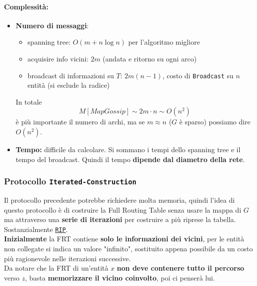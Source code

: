 \paragraph{Complessità:}
\begin{itemize}
	\item \textbf{Numero di messaggi}:
	\begin{itemize}
		\item spanning tree: $O(m + n \log n)$ per l'algoritmo migliore
		\item acquisire info vicini: $2m$ (andata e ritorno su ogni arco)
		\item broadcast di informazioni su $T$: $2m (n-1)$, costo di \texttt{Broadcast} su $n$ entità (si esclude la radice)
	\end{itemize}
	In totale
	$$ M[MapGossip] \sim 2m \cdot n \sim O(n^2) $$
	è più importante il numero di archi, ma se $m \approx n$ ($G$ è sparso) possiamo dire $O(n^2)$.\\
	
	\item \textbf{Tempo:} difficile da calcolare. Si sommano i tempi dello spanning tree e il tempo del broadcast. Quindi il tempo \textbf{dipende dal diametro della rete}.\\
\end{itemize}

\newpage

\subsubsection{Protocollo \texttt{Iterated-Construction}}
Il protocollo precedente potrebbe richiedere molta memoria, quindi l'idea di questo protocollo è di costruire la Full Routing Table senza usare la mappa di $G$ ma attraverso una \textbf{serie di iterazioni} per costruire a più riprese la tabella. Sostanzialmente \href{https://it.wikipedia.org/wiki/Routing_Information_Protocol}{\texttt{RIP}}.\\

\textbf{Inizialmente} la FRT contiene \textbf{solo le informazioni dei vicini}, per le entità non collegate si indica un valore "infinito", sostituito appena possibile da un costo più ragionevole nelle iterazioni successive.\\

Da notare che la FRT di un'entità $x$ \textbf{non deve contenere tutto il percorso} verso $z$, basta \textbf{memorizzare il vicino coinvolto}, poi ci penserà lui.\\

